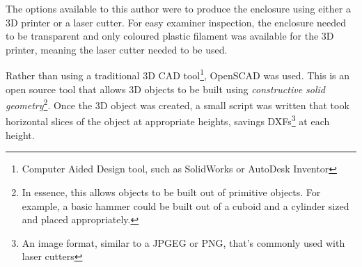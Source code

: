 The options available to this author were to produce the enclosure using either
a 3D printer or a laser cutter. For easy examiner inspection, the enclosure
needed to be transparent and only coloured plastic filament was available for
the 3D printer, meaning the laser cutter needed to be used.

Rather than using a traditional 3D CAD tool\footnote{Computer Aided Design tool,
such as SolidWorks or AutoDesk Inventor}, OpenSCAD was used. This is an open
source tool that allows 3D objects to be built using \textit{constructive solid
geometry}\footnote{In essence, this allows objects to be built out of primitive
  objects. For example, a basic hammer could be built out of a cuboid and a
cylinder sized and placed appropriately.}. Once the 3D object was created, a
small script was written that took horizontal slices of the object at
appropriate heights, savings DXFs\footnote{An image format, similar to a JPGEG
or PNG, that's commonly used with laser cutters} at each height.

